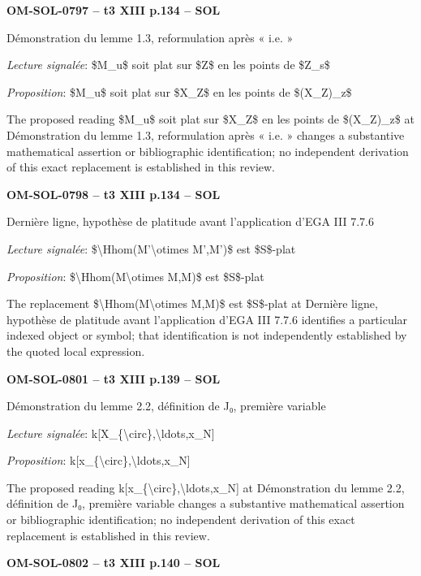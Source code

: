 \par\noindent\textbf{OM-SOL-0797 -- t3 XIII p.134 -- SOL}\par
Démonstration du lemme 1.3, reformulation après « i.e. »\par
\emph{Lecture signalée}: \$M\_u\$ soit plat sur \$Z\$ en les points de \$Z\_s\$\par
\emph{Proposition}: \$M\_u\$ soit plat sur \$X\_Z\$ en les points de \$(X\_Z)\_z\$\par
The proposed reading \$M\_u\$ soit plat sur \$X\_Z\$ en les points de \$(X\_Z)\_z\$ at Démonstration du lemme 1.3, reformulation après « i.e. » changes a substantive mathematical assertion or bibliographic identification; no independent derivation of this exact replacement is established in this review.\par
\par\noindent\textbf{OM-SOL-0798 -- t3 XIII p.134 -- SOL}\par
Dernière ligne, hypothèse de platitude avant l'application d'EGA III 7.7.6\par
\emph{Lecture signalée}: \$\textbackslash{}Hhom(M'\textbackslash{}otimes M',M')\$ est \$S\$-plat\par
\emph{Proposition}: \$\textbackslash{}Hhom(M\textbackslash{}otimes M,M)\$ est \$S\$-plat\par
The replacement \$\textbackslash{}Hhom(M\textbackslash{}otimes M,M)\$ est \$S\$-plat at Dernière ligne, hypothèse de platitude avant l'application d'EGA III 7.7.6 identifies a particular indexed object or symbol; that identification is not independently established by the quoted local expression.\par
\par\noindent\textbf{OM-SOL-0801 -- t3 XIII p.139 -- SOL}\par
Démonstration du lemme 2.2, définition de J₀, première variable\par
\emph{Lecture signalée}: k[X\_\{\textbackslash{}circ\},\textbackslash{}ldots,x\_N]\par
\emph{Proposition}: k[x\_\{\textbackslash{}circ\},\textbackslash{}ldots,x\_N]\par
The proposed reading k[x\_\{\textbackslash{}circ\},\textbackslash{}ldots,x\_N] at Démonstration du lemme 2.2, définition de J₀, première variable changes a substantive mathematical assertion or bibliographic identification; no independent derivation of this exact replacement is established in this review.\par
\par\noindent\textbf{OM-SOL-0802 -- t3 XIII p.140 -- SOL}\par
